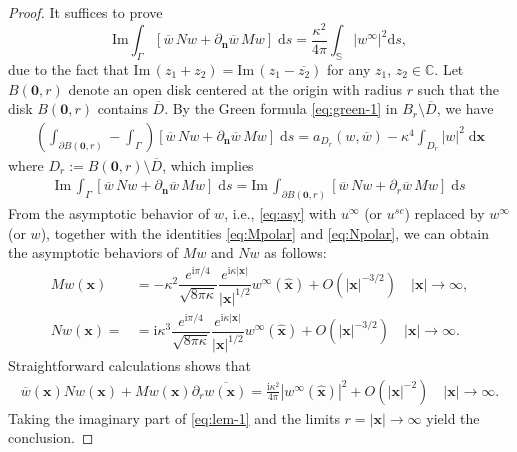 \documentclass[10pt,a4paper]{article}
\numberwithin{equation}{section}
\begin{document}
\begin{proof}
  It suffices to prove
\begin{equation*}
    \mathrm{Im} \int_{\Gamma}[\overline{w}\, N w +  \partial_{\bm{n}}\overline{w}\, M w] \;\mathrm{d}s
    = \frac{\kappa^{2}}{4\pi}\int_{\mathbb{S}}|w^{\infty}|^{2}\mathrm{d}s,
  \end{equation*}
  due to the fact that $\mathrm{Im}\,(z_1+z_2)=\mathrm{Im}\, (z_1-\overline{z_{2}})$ for any $z_1$, $z_2 \in \mathbb{C}$.
  Let  $B(\bm{ 0 },r)$ denote an open disk  centered at the origin with radius  $r$  such that the disk $B(\bm{ 0 },r)$ contains $\overline{D}$.
  By the Green formula \eqref{eq:green-1} in $B_r\setminus \overline{D}$, we have
 \begin{align*}  %
   \left( \int_{\partial B(\bm{ 0 },r)}- \int_{\Gamma}\right)
   [\overline{w}\, N w + \partial_{\bm{n}}\overline{w} \, M w]\;\mathrm{d}s
   = a_{D_r}(w,\overline{w}) - \kappa^4  \int_{D_r}| w | ^2\;\mathrm{d} \bm{ x }
\end{align*}
  where $D_r:=B(\bm{ 0 },r)\setminus \overline{D}$, which implies 
  \begin{align}  \label{eq:lem-1}
   \mathrm{Im}\, \int_{\Gamma}[\overline{w}\, N w + \partial_{\bm{n}}\overline{w} \, M w]\;\mathrm{d}s
     =\mathrm{Im}\, \int_{\partial B(\bm{ 0 },r)}[\overline{w}\, N w +\partial_{r}\overline{w} \,   M w]\;\mathrm{d}s 
  \end{align}
From the asymptotic behavior of $w$, i.e., \eqref{eq:asy} with $u^{\infty}$ (or $u^{sc}$) replaced by $w^{\infty}$ (or $w$),
together with the identities \eqref{eq:Mpolar} and \eqref{eq:Npolar},
we can obtain the asymptotic behaviors of $M w$ and $N w$ as
follows:
\begin{align*}
  M w \left( \bm{ x } \right)
  &= -\kappa^2  \dfrac{e^{\mathrm{i} \pi/4   }}{\sqrt{8\pi \kappa}}
        \dfrac{e^{\mathrm{i}\kappa | \bm{x} | }}{| \bm{ x }  |^{1/2} } w^{\infty} \left( \hat{\bm{ x }} \right)
        + O \left( | \bm{ x } |^{-3/2}   \right) \quad | \bm{ x }  |\to \infty, \\
  N w \left( \bm{ x } \right) =& = \mathrm{ i } \kappa^3  \dfrac{e^{\mathrm{i} \pi/4   }}{\sqrt{8\pi \kappa}}
                                 \dfrac{e^{\mathrm{i}\kappa | \bm{x} | }}{| \bm{ x }  |^{1/2} } w^{\infty} \left( \hat{\bm{ x }} \right)
                                  + O \left( | \bm{ x } |^{-3/2}   \right) \quad | \bm{ x }  |\to \infty.
\end{align*}
Straightforward calculations shows that
\begin{align*}
  \overline{w}\left(\bm{ x } \right) N w\left(\bm{ x  }\right)
  + M w\left(\bm{ x } \right) \partial_{r}\overline{w\left(\bm{ x } \right)} =
  \frac{\mathrm{ i }  \kappa^{2}}{4\pi} |w^{\infty} \left( \hat{\bm{ x }} \right) |^2
  + O \left( | \bm{ x } |^{-2}\right) \quad  | \bm{ x }  |\to \infty.
\end{align*}
Taking the imaginary part of \eqref{eq:lem-1} and the limits $r=| \bm{ x } | \to \infty$ yield the conclusion.
\end{proof}
\end{document}
